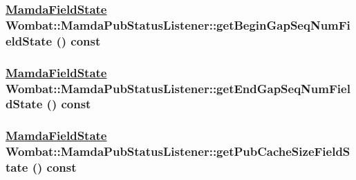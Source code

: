 \hypertarget{classWombat_1_1MamdaPubStatusListener_df5268fab3cedd4a767fbb8f3e29e7ec}{
\subsubsection[getBeginGapSeqNumFieldState]{\setlength{\rightskip}{0pt plus 5cm}\hyperlink{namespaceWombat_93aac974f2ab713554fd12a1fa3b7d2a}{Mamda\-Field\-State} Wombat::Mamda\-Pub\-Status\-Listener::get\-Begin\-Gap\-Seq\-Num\-Field\-State () const}}
\label{classWombat_1_1MamdaPubStatusListener_df5268fab3cedd4a767fbb8f3e29e7ec}


\hypertarget{classWombat_1_1MamdaPubStatusListener_54fd8bef174d993cc0c9f5710f585b07}{
\subsubsection[getEndGapSeqNumFieldState]{\setlength{\rightskip}{0pt plus 5cm}\hyperlink{namespaceWombat_93aac974f2ab713554fd12a1fa3b7d2a}{Mamda\-Field\-State} Wombat::Mamda\-Pub\-Status\-Listener::get\-End\-Gap\-Seq\-Num\-Field\-State () const}}
\label{classWombat_1_1MamdaPubStatusListener_54fd8bef174d993cc0c9f5710f585b07}


\hypertarget{classWombat_1_1MamdaPubStatusListener_af630b2a9c628d5bad3f6b48bb1de598}{
\subsubsection[getPubCacheSizeFieldState]{\setlength{\rightskip}{0pt plus 5cm}\hyperlink{namespaceWombat_93aac974f2ab713554fd12a1fa3b7d2a}{Mamda\-Field\-State} Wombat::Mamda\-Pub\-Status\-Listener::get\-Pub\-Cache\-Size\-Field\-State () const}}
\label{classWombat_1_1MamdaPubStatusListener_af630b2a9c628d5bad3f6b48bb1de598}


